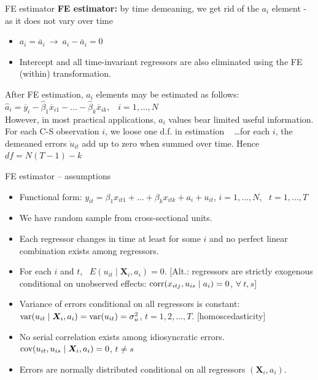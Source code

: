 \documentclass[usenames,dvipsnames]{beamer}
\begin{document}
\begin{frame}{FE estimator}
\textbf{FE estimator:} by time demeaning, we get rid of the $a_i$ element - as it does not vary over time 
\medskip
\begin{itemize}
\item $a_i = \overline{a}_i \ \rightarrow \ a_i - \overline{a}_i = 0$
\item Intercept and all time-invariant regressors are also eliminated using the FE (within) transformation.
\end{itemize}
\medskip
After FE estimation, $a_i$ elements may be estimated as follows:\\ \medskip
$\hat{a}_i =\overline{y}_i - \hat{\beta}_1 \overline{x}_{i1} - \dots - \hat{\beta}_k \overline{x}_{ik},$ \ $i = 1, \dots, N$ \\
\medskip
However, in most practical applications, $a_i$ values bear limited useful information.\\ \medskip
For each C-S observation $i$, we loose one d.f. in estimation ~ \dots for each $i$, the demeaned errors $\ddot{u}_{it}$ add up to zero when summed over time. Hence \ $df = N(T-1)-k$
\end{frame}
\begin{frame}{FE estimator – assumptions}
\begin{itemize}
\item[\textbf{FE.1}] Functional form: $y_{it} = \beta_1 x_{it1} + \dots + \beta_k x_{itk} + a_i + u_{it}$, $i = 1, \dots, N$, \ $t = 1, \dots, T$
\item[\textbf{FE.2}] We have random sample from cross-sectional units.
\item[\textbf{FE.3}] Each regressor changes in time at least for some $i$ and no perfect linear combination exists among regressors.
\item[\textbf{FE.4}] For each $i$ and $t$, \ $E (u_{it} \mid \bm{X}_i, a_i) = 0$. [Alt.: regressors are strictly exogenous conditional on unobserved effects: $\textnormal{corr}(x_{itj}, u_{is} \mid a_i)=0$, \quad $\forall \ t, s$]
\item[\textbf{FE.5}] Variance of errors conditional on all regressors is constant: $\textnormal{var}(u_{it} \mid \bm{X}_i, a_i) = \textnormal{var}(u_{it}) = \sigma^2_u$, \quad $t= 1,2, \dots, T$. [homoscedasticity]
\item[\textbf{FE.6}] No serial correlation exists among idiosyncratic errors. $\textnormal{cov}(u_{it}, u_{is} \mid \bm{X}_i, a_i) = 0$, \quad $t \neq s$
\item[\textbf{FE.7}] Errors are normally distributed conditional on all regressors $(\bm{X}_i, a_i)$.
\end{itemize}
\end{frame}
\end{document}
